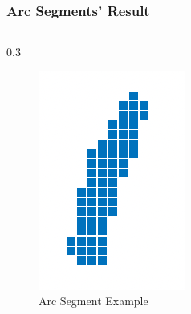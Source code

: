 \documentclass{beamer}
\begin{document}
    \begin{frame}
        \frametitle{Arc Segments' Result}
    
        \begin{columns}
            \begin{column}
                {0.3\linewidth}
                \begin{figure}
                    \includegraphics[width=\linewidth]{pic/arc.png}
                    \caption{Arc Segment Example}
                \end{figure}
            \end{column}
            

\end{columns}
\end{frame}
\end{document}
